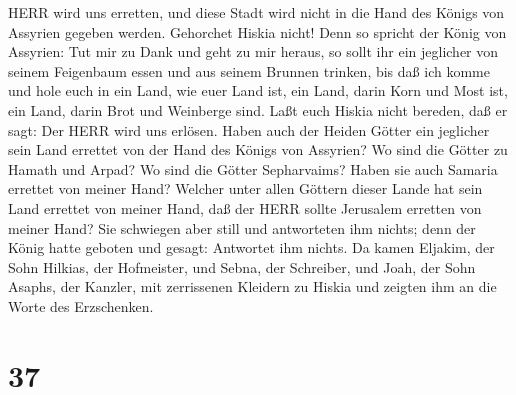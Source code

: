 HERR wird uns erretten, und diese Stadt wird nicht in die Hand des
Königs von Assyrien gegeben werden.  Gehorchet Hiskia
nicht! Denn so spricht der König von Assyrien: Tut mir zu Dank und geht
zu mir heraus, so sollt ihr ein jeglicher von seinem Feigenbaum essen
und aus seinem Brunnen trinken,  bis daß ich komme und hole
euch in ein Land, wie euer Land ist, ein Land, darin Korn und Most ist,
ein Land, darin Brot und Weinberge sind.  Laßt euch Hiskia
nicht bereden, daß er sagt: Der HERR wird uns erlösen. Haben auch der
Heiden Götter ein jeglicher sein Land errettet von der Hand des Königs
von Assyrien?  Wo sind die Götter zu Hamath und Arpad? Wo
sind die Götter Sepharvaims? Haben sie auch Samaria errettet von meiner
Hand?  Welcher unter allen Göttern dieser Lande hat sein
Land errettet von meiner Hand, daß der HERR sollte Jerusalem erretten
von meiner Hand?  Sie schwiegen aber still und antworteten
ihm nichts; denn der König hatte geboten und gesagt: Antwortet ihm
nichts.  Da kamen Eljakim, der Sohn Hilkias, der
Hofmeister, und Sebna, der Schreiber, und Joah, der Sohn Asaphs, der
Kanzler, mit zerrissenen Kleidern zu Hiskia und zeigten ihm an die Worte
des Erzschenken.

\hypertarget{section-36}{%
\section{37}\label{section-36}}

